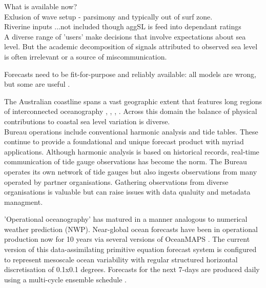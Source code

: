 \documentclass[jmse,article,submit,moreauthors,pdftex,10pt,a4paper]{mdpi}
\begin{document}
What is available now?\\
Exlusion of wave setup - parsimony and typically out of surf zone.\\
Riverine inputs ...not included though aggSL is feed into dependant ratings \\


A diverse range of 'users' make decisions that involve expectations about sea level. 
But the academic decomposition of signals attributed to observed sea level is often irrelevant or a source of miscommunication. 

Forecasts need to be fit-for-purpose and reliably available: all models are wrong, but some are useful \cite{Box:1979hl} .

The Australian coastline spans a vast geographic extent that features long regions of interconnected oceanography \cite{Ridgway:2004kb}, \cite{Church:1986tl}, \cite{Haigh:2013bn}, \cite{Woodham:2013cl}.  Across this domain the balance of physical contributions to coastal sea level variation is diverse.\\


Bureau operations include conventional harmonic analysis and tide tables.
These continue to provide a foundational and unique forecast product with myriad applications.
Although harmonic analysis is based on historical records, real-time communication of tide gauge observations has become the norm.
The Bureau operates its own network of tide gauges \cite{Greenslade:2012um} but also ingests observations from many operated by partner organisations.   
Gathering observations from diverse organisations is valuable but can raise issues with data qualuity and metadata managment.



'Operational oceanography' \cite{Bell:2009uv} has matured in a manner analogous to numerical weather prediction (NWP).
Near-global ocean forecasts have been in operational production now for 10 years via several versions of OceanMAPS  
\cite{Brassington:2007ut}\cite{NMOC:2007wq}\cite{BureauofMeterology:2011ta}\cite{Brassington:2012wm}.
The current version of this data-assimilating primitive equation forecast system is configured to represent mesoscale ocean variability with regular structured horizontal discretisation of 0.1x0.1 degrees.
Forecasts for the next 7-days are produced daily using a multi-cycle ensemble schedule \cite{GaryBBrassington:2013jw}.
\end{document}
